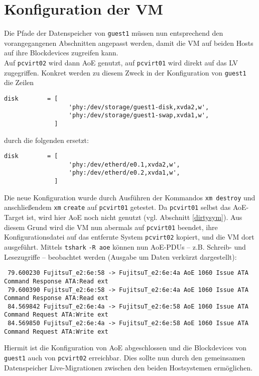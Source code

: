 \section{Konfiguration der VM}
Die Pfade der Datenspeicher von \verb#guest1# müssen nun entsprechend den vorangegangenen Abschnitten angepasst werden, damit die VM auf beiden Hosts auf ihre Blockdevices zugreifen kann.
\\
Auf \verb#pcvirt02# wird dann AoE genutzt, auf \verb#pcvirt01# wird direkt auf das LV zugegriffen. Konkret werden zu diesem Zweck in der Konfiguration von \verb#guest1# die Zeilen
\setupVerbatimOut
\begin{verbatim}
disk        = [
                  'phy:/dev/storage/guest1-disk,xvda2,w',
                  'phy:/dev/storage/guest1-swap,xvda1,w',
              ]
\end{verbatim}
durch die folgenden ersetzt:
\setupVerbatimOut
\begin{verbatim}
disk        = [
                  'phy:/dev/etherd/e0.1,xvda2,w',
                  'phy:/dev/etherd/e0.2,xvda1,w',
              ]
\end{verbatim}

Die neue Konfiguration wurde durch Ausführen der Kommandos \verb#xm destroy# und anschließendem \verb#xm# \verb#create# auf \verb#pcvirt01# getestet. Da \verb#pcvirt01# selbst das AoE-Target ist, wird hier AoE noch nicht genutzt (vgl. Abschnitt \ref{dirtysym}).
Aus diesem Grund wird die VM nun abermals auf \verb#pcvirt01# beendet, ihre Konfigurationsdatei auf das entfernte System \verb#pcvirt02# kopiert, und die VM dort ausgeführt. Mittels \verb#tshark# \verb#-R aoe# können nun AoE-PDUs -- z.B. Schreib- und Lesezugriffe -- beobachtet werden (Ausgabe um Daten verkürzt dargestellt):
\setupVerbatimOut
\begin{verbatim}
 79.600230 FujitsuT_e2:6e:58 -> FujitsuT_e2:6e:4a AoE 1060 Issue ATA Command Response ATA:Read ext
 79.600390 FujitsuT_e2:6e:58 -> FujitsuT_e2:6e:4a AoE 1060 Issue ATA Command Response ATA:Read ext
 84.569842 FujitsuT_e2:6e:4a -> FujitsuT_e2:6e:58 AoE 1060 Issue ATA Command Request ATA:Write ext
 84.569850 FujitsuT_e2:6e:4a -> FujitsuT_e2:6e:58 AoE 1060 Issue ATA Command Request ATA:Write ext
\end{verbatim}

Hiermit ist die Konfiguration von AoE abgeschlossen und die Blockdevices von \verb#guest1# auch von \verb#pcvirt02# erreichbar. Dies sollte nun durch den gemeinsamen Datenspeicher Live-Migrationen zwischen den beiden Hostsystemen ermöglichen.

